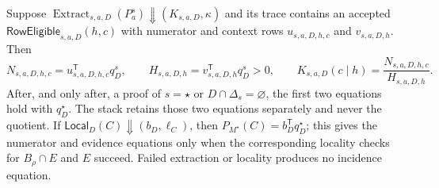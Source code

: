 Suppose \(\operatorname{Extract}_{s,a,D}(P_a^s)\Downarrow(K_{s,a,D},\kappa)\) and its trace contains an accepted \(\mathsf{RowEligible}_{s,a,D}(h,c)\) with numerator and context rows \(u_{s,a,D,h,c}\) and \(v_{s,a,D,h}\).  Then
\[
N_{s,a,D,h,c}=u_{s,a,D,h,c}^{\mathsf T}q_D^s,\qquad
H_{s,a,D,h}=v_{s,a,D,h}^{\mathsf T}q_D^s>0,\qquad
K_{s,a,D}(c\mid h)=\frac{N_{s,a,D,h,c}}{H_{s,a,D,h}}.
\]
After, and only after, a proof of \(s=\star\) or \(D\cap\Delta_s=\varnothing\), the first two equations hold with \(q_D^\star\).  The stack retains those two equations separately and never the quotient.  If \(\mathsf{Local}_D(C)\Downarrow(b_D,\ell_C)\), then \(P_{M^\star}(C)=b_D^{\mathsf T}q_D^\star\); this gives the numerator and evidence equations only when the corresponding locality checks for \(B_\rho\cap E\) and \(E\) succeed.  Failed extraction or locality produces no incidence equation.
